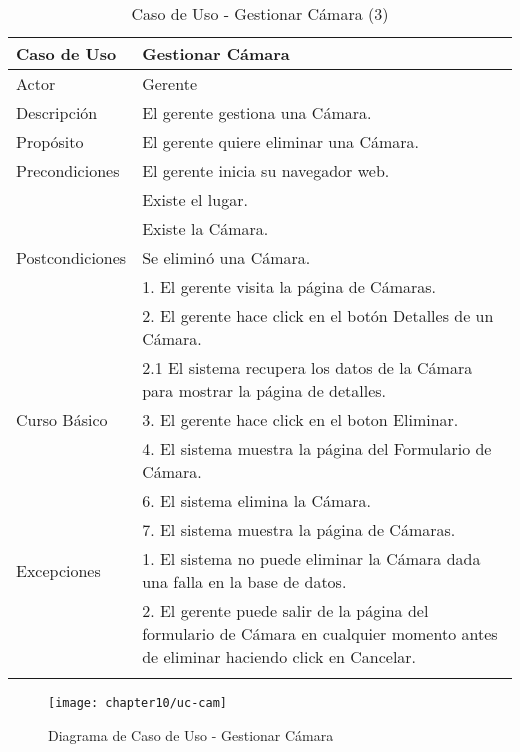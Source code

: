 \begin{longtable}{@{} p{3cm} p{10cm} @{}} \toprule
    \textbf{Caso de Uso}    & Gestionar Cámara \\ \midrule
    Actor                   & Gerente \\ \cmidrule{1-2}
    Descripción             & El gerente gestiona una Cámara. \\ \cmidrule{1-2}
    Propósito               & El gerente quiere eliminar una Cámara. \\ \cmidrule{1-2}
    Precondiciones          & El gerente inicia su navegador web. \\
                            & Existe el lugar. \\
                            & Existe la Cámara. \\ \cmidrule{1-2} 
    Postcondiciones         & Se eliminó una Cámara. \\ \cmidrule{1-2} 
                            & 1. El gerente visita la página de Cámaras. \\ 
                            & 2. El gerente hace click en el botón Detalles de un Cámara. \\
                            & 2.1 El sistema recupera los datos de la Cámara para mostrar la página de detalles. \\
    Curso Básico            & 3. El gerente hace click en el boton Eliminar. \\
                            & 4. El sistema muestra la página del Formulario de Cámara. \\
                            & 6. El sistema elimina la Cámara. \\ 
                            & 7. El sistema muestra la página de Cámaras. \\ \cmidrule{1-2}
    Excepciones             & 1. El sistema no puede eliminar la Cámara dada una falla en la base de datos. \\
                            & 2. El gerente puede salir de la página del formulario de Cámara en cualquier momento antes de eliminar haciendo click en Cancelar. \\ \bottomrule
   \caption{Caso de Uso - Gestionar Cámara (3)} \label{tab:tabcu-cam3} \\
   \end{longtable}

    
    
    \begin{figure}[H]
        \centering
        \texttt{[image: chapter10/uc-cam]}
        \caption{Diagrama de Caso de Uso - Gestionar Cámara}
        \label{fig:uc-cam}
    \end{figure}
    
